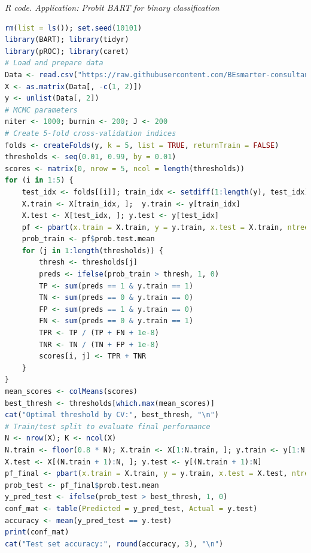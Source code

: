 \begin{enumerate}[leftmargin=*]
\begin{tcolorbox}[enhanced,width=4.67in,center upper,
	fontupper=\large\bfseries,drop shadow southwest,sharp corners]
	\textit{R code. Application: Probit BART for binary classification}
	\begin{VF}
		\begin{lstlisting}[language=R]
rm(list = ls()); set.seed(10101)
library(BART); library(tidyr)
library(pROC); library(caret)
# Load and prepare data
Data <- read.csv("https://raw.githubusercontent.com/BEsmarter-consultancy/BSTApp/refs/heads/master/DataApp/Conflict.csv", sep = ",", header = TRUE, quote = "")
X <- as.matrix(Data[, -c(1, 2)])
y <- unlist(Data[, 2])
# MCMC parameters
niter <- 1000; burnin <- 200; J <- 200
# Create 5-fold cross-validation indices
folds <- createFolds(y, k = 5, list = TRUE, returnTrain = FALSE)
thresholds <- seq(0.01, 0.99, by = 0.01)
scores <- matrix(0, nrow = 5, ncol = length(thresholds))
for (i in 1:5) {
	test_idx <- folds[[i]]; train_idx <- setdiff(1:length(y), test_idx)
	X.train <- X[train_idx, ]; 	y.train <- y[train_idx]
	X.test <- X[test_idx, ]; y.test <- y[test_idx]
	pf <- pbart(x.train = X.train, y = y.train, x.test = X.train, ntree = J, ndpost = niter, nskip = burnin)
	prob_train <- pf$prob.test.mean
	for (j in 1:length(thresholds)) {
		thresh <- thresholds[j]
		preds <- ifelse(prob_train > thresh, 1, 0)
		TP <- sum(preds == 1 & y.train == 1)
		TN <- sum(preds == 0 & y.train == 0)
		FP <- sum(preds == 1 & y.train == 0)
		FN <- sum(preds == 0 & y.train == 1)
		TPR <- TP / (TP + FN + 1e-8)
		TNR <- TN / (TN + FP + 1e-8)
		scores[i, j] <- TPR + TNR
	}
}
mean_scores <- colMeans(scores)
best_thresh <- thresholds[which.max(mean_scores)]
cat("Optimal threshold by CV:", best_thresh, "\n")
# Train/test split to evaluate final performance
N <- nrow(X); K <- ncol(X)
N.train <- floor(0.8 * N); X.train <- X[1:N.train, ]; y.train <- y[1:N.train]
X.test <- X[(N.train + 1):N, ]; y.test <- y[(N.train + 1):N]
pf_final <- pbart(x.train = X.train, y = y.train, x.test = X.test, ntree = 200, ndpost = 1000, nskip = 200)
prob_test <- pf_final$prob.test.mean
y_pred_test <- ifelse(prob_test > best_thresh, 1, 0)
conf_mat <- table(Predicted = y_pred_test, Actual = y.test)
accuracy <- mean(y_pred_test == y.test)
print(conf_mat)
cat("Test set accuracy:", round(accuracy, 3), "\n")
\end{lstlisting}
	\end{VF}
\end{tcolorbox} 


\end{enumerate}

